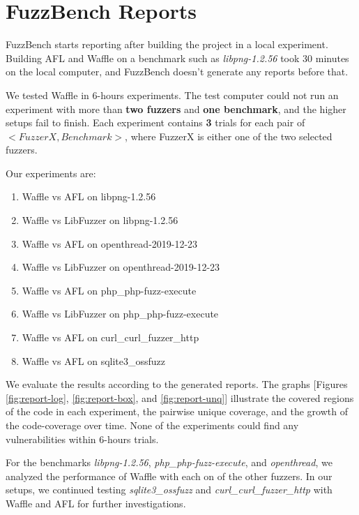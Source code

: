 \section{FuzzBench Reports}
\label{sec:report}

FuzzBench starts reporting after building the project in a local experiment. Building AFL and Waffle on a benchmark such as \textit{libpng-1.2.56} took 30 minutes on the local computer, and FuzzBench doesn't generate any reports before that.

We tested Waffle in 6-hours experiments. The test computer could not run an experiment with more than \textbf{two fuzzers} and \textbf{one benchmark}, and the higher setups fail to finish. Each experiment contains \textbf{3} trials for each pair of $<FuzzerX, Benchmark>$, where FuzzerX is either one of the two selected fuzzers.

Our experiments are:

\begin{enumerate}
    \item Waffle vs AFL on libpng-1.2.56
    \item Waffle vs LibFuzzer on libpng-1.2.56
    \item Waffle vs AFL on openthread-2019-12-23
    \item Waffle vs LibFuzzer on openthread-2019-12-23
    \item Waffle vs AFL on php\_php-fuzz-execute
    \item Waffle vs LibFuzzer on php\_php-fuzz-execute
    \item Waffle vs AFL on curl\_curl\_fuzzer\_http
    \item Waffle vs AFL on sqlite3\_ossfuzz
\end{enumerate}

We evaluate the results according to the generated reports. The graphs [Figures \ref{fig:report-log}, \ref{fig:report-box}, and \ref{fig:report-unq}] illustrate the covered regions of the code in each experiment, the pairwise unique coverage, and the growth of the code-coverage over time. None of the experiments could find any vulnerabilities within 6-hours trials.

For the benchmarks \textit{libpng-1.2.56}, \textit{php\_php-fuzz-execute}, and \textit{openthread}, we analyzed the performance of Waffle with each on of the other fuzzers. In our setups, we continued testing \textit{sqlite3\_ossfuzz} and \textit{curl\_curl\_fuzzer\_http} with Waffle and AFL for further investigations.

